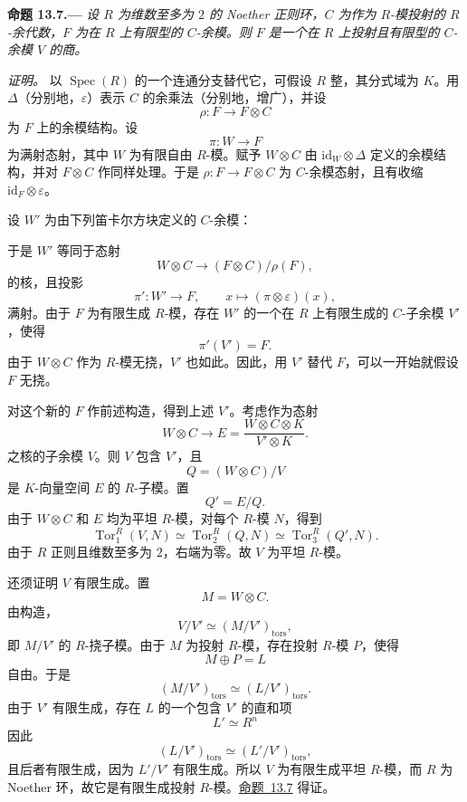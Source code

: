 \medskip
{}\label{prop:sga3-VIB-13.7}%
\noindent\textbf{命题 13.7.---}
\emph{设 \(R\) 为维数至多为 \(2\) 的 Noether 正则环，\(C\) 为作为 \(R\)-模投射的 \(R\)-余代数，\(F\) 为在 \(R\) 上有限型的 \(C\)-余模。则 \(F\) 是一个在 \(R\) 上投射且有限型的 \(C\)-余模 \(V\) 的商。}

\emph{证明。}
以 \(\operatorname{Spec}(R)\) 的一个连通分支替代它，可假设 \(R\) 整，其分式域为 \(K\)。用 \(\Delta\)\textup{（分别地，\(\varepsilon\)）}表示 \(C\) 的余乘法\textup{（分别地，增广）}，并设
\[
  \rho:F\longrightarrow F\otimes C
\]
为 \(F\) 上的余模结构。设
\[
  \pi:W\longrightarrow F
\]
为满射态射，其中 \(W\) 为有限自由 \(R\)-模。赋予 \(W\otimes C\) 由 \(\mathrm{id}_W\otimes\Delta\) 定义的余模结构，并对 \(F\otimes C\) 作同样处理。于是 \(\rho:F\to F\otimes C\) 为 \(C\)-余模态射，且有收缩 \(\mathrm{id}_F\otimes\varepsilon\)。

设 \(W'\) 为由下列笛卡尔方块定义的 \(C\)-余模：
\begin{center}
  \label{diag:sga3-VIB-13.7-cartesian-square}%
\end{center}
于是 \(W'\) 等同于态射
\[
  W\otimes C\longrightarrow(F\otimes C)/\rho(F),
\]
的核，且投影
\[
  \pi':W'\longrightarrow F,
  \qquad
  x\longmapsto(\pi\otimes\varepsilon)(x),
\]
满射。由于 \(F\) 为有限生成 \(R\)-模，存在 \(W'\) 的一个在 \(R\) 上有限生成的 \(C\)-子余模 \(V'\)，使得
\[
  \pi'(V')=F.
\]
由于 \(W\otimes C\) 作为 \(R\)-模无挠，\(V'\) 也如此。因此，用 \(V'\) 替代 \(F\)，可以一开始就假设 \(F\) 无挠。

对这个新的 \(F\) 作前述构造，得到上述 \(V'\)。考虑作为态射
\label{form:sga3-VIB-13.7-E-quotient}%
\[
  W\otimes C\longrightarrow
  E=\frac{W\otimes C\otimes K}{V'\otimes K}.
\]
之核的子余模 \(V\)。则 \(V\) 包含 \(V'\)，且
\[
  Q=(W\otimes C)/V
\]
是 \(K\)-向量空间 \(E\) 的 \(R\)-子模。置
\[
  Q'=E/Q.
\]
由于 \(W\otimes C\) 和 \(E\) 均为平坦 \(R\)-模，对每个 \(R\)-模 \(N\)，得到
\label{form:sga3-VIB-13.7-Tor}%
\[
  \operatorname{Tor}_1^R(V,N)
    \simeq
  \operatorname{Tor}_2^R(Q,N)
    \simeq
  \operatorname{Tor}_3^R(Q',N).
\]
由于 \(R\) 正则且维数至多为 \(2\)，右端为零。故 \(V\) 为平坦 \(R\)-模。

还须证明 \(V\) 有限生成。置
\[
  M=W\otimes C.
\]
由构造，
\[
  V/V'\simeq(M/V')_{\mathrm{tors}},
\]
即 \(M/V'\) 的 \(R\)-挠子模。由于 \(M\) 为投射 \(R\)-模，存在投射 \(R\)-模 \(P\)，使得
\[
  M\oplus P=L
\]
自由。于是
\[
  (M/V')_{\mathrm{tors}}
    \simeq
  (L/V')_{\mathrm{tors}}.
\]
由于 \(V'\) 有限生成，存在 \(L\) 的一个包含 \(V'\) 的直和项
\[
  L'\simeq R^n
\]
因此
\[
  (L/V')_{\mathrm{tors}}
    \simeq
  (L'/V')_{\mathrm{tors}},
\]
且后者有限生成，因为 \(L'/V'\) 有限生成。所以 \(V\) 为有限生成平坦 \(R\)-模，而 \(R\) 为 Noether 环，故它是有限生成投射 \(R\)-模。\hyperref[prop:sga3-VIB-13.7]{命题~13.7} 得证。

